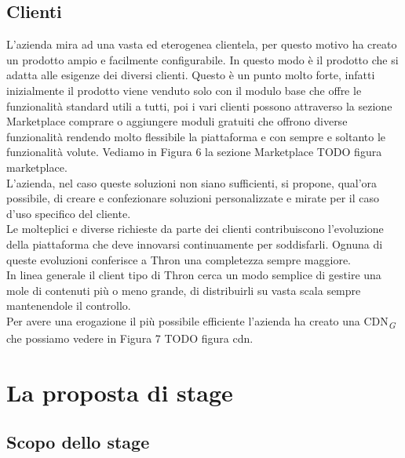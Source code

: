 \documentclass[a4paper, 12pt, twoside, openright]{book}
\newcommand{\gloss}[1]{#1\textsubscript{\textit{\tiny{G}}}}
\begin{document}
\section{Clienti}
L'azienda mira ad una vasta ed eterogenea clientela, per questo motivo ha creato un prodotto ampio e facilmente configurabile. In questo modo è il prodotto che si adatta alle esigenze dei diversi clienti. Questo è un punto molto forte, infatti inizialmente il prodotto viene venduto solo con il modulo base che offre le funzionalità standard utili a tutti, poi i vari clienti possono attraverso la sezione Marketplace comprare o aggiungere moduli gratuiti che offrono diverse funzionalità rendendo molto flessibile la piattaforma e con sempre e soltanto le funzionalità volute. Vediamo in Figura 6 la sezione Marketplace TODO figura marketplace.\\
L'azienda, nel caso queste soluzioni non siano sufficienti, si propone, qual'ora possibile, di creare e confezionare soluzioni personalizzate e mirate per il caso d'uso specifico del cliente.\\
Le molteplici e diverse richieste da parte dei clienti contribuiscono l'evoluzione della piattaforma che deve innovarsi continuamente per soddisfarli. Ognuna di queste evoluzioni conferisce a Thron una completezza sempre maggiore.\\
In linea generale il client tipo di Thron cerca un modo semplice di gestire una mole di contenuti più o meno grande, di distribuirli su vasta scala sempre mantenendole il controllo.\\
Per avere una erogazione il più possibile efficiente l'azienda ha creato una \gloss{CDN} che possiamo vedere in Figura 7 TODO figura cdn.\\

\chapter{La proposta di stage}

\section{Scopo dello stage}
\end{document}
